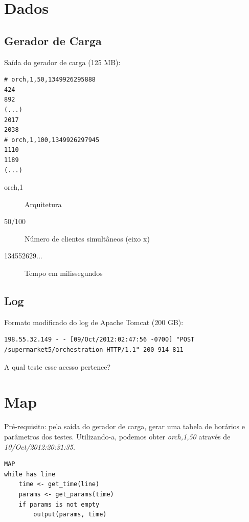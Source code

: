 \documentclass{beamer}
\begin{document}
\section{Dados}

\subsection{Gerador de Carga}
\begin{frame}[fragile]
Saída do gerador de carga (125 MB):

\begin{verbatim}
# orch,1,50,1349926295888
424
892
(...)
2017
2038
# orch,1,100,1349926297945
1110
1189
(...)
\end{verbatim}

\begin{description}
\item[orch,1] Arquitetura
\item[50/100] Número de clientes simultâneos (eixo x)
\item[134552629...] Tempo em milissegundos
\end{description}
\end{frame}

\subsection{Log}
\begin{frame}[fragile]
Formato modificado do log de Apache Tomcat (200 GB):
\begin{verbatim}
198.55.32.149 - - [09/Oct/2012:02:47:56 -0700] "POST
/supermarket5/orchestration HTTP/1.1" 200 914 811
\end{verbatim}
A qual teste esse acesso pertence?
\end{frame}

\section{Map}
\begin{frame}[fragile]
Pré-requisito: pela saída do gerador de carga, gerar uma tabela de horários e parâmetros dos testes. Utilizando-a, podemos obter \emph{orch,1,50} através de \emph{10/Oct/2012:20:31:35}.

\begin{verbatim}
MAP
while has line
    time <- get_time(line)
    params <- get_params(time)
    if params is not empty
        output(params, time)
\end{verbatim}
\end{frame}
\end{document}
